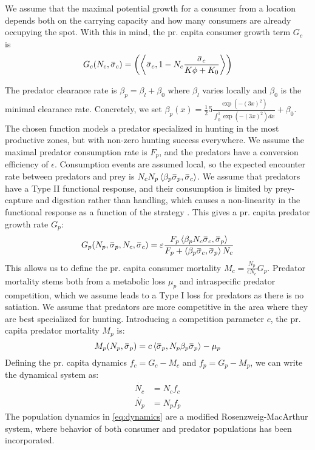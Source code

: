 We assume that the maximal potential growth for a consumer from a location depends both on the carrying capacity and how many consumers are already occupying the spot. With this in mind, the pr. capita consumer growth term $G_c$ is
\begin{equation}
  G_c(N_c, \overbar{\sigma}_c) = \pa{\ip{\overbar{\sigma}_c}{1-N_c \frac{\overbar{\sigma}_c}{K\phi + K_0}}}
\end{equation}

The predator clearance rate is $\beta_p = \beta_{l} + \beta_0$ where $\beta_l$ varies locally and $\beta_0$ is the minimal clearance rate. Concretely, we set $\beta_p(x) = \frac{1}{2}5 \frac{\exp(-(3 x)^2)}{\int_0^1 \exp(-(3 x)^2) dx} + \beta_0$. The chosen function models a predator specialized in hunting in the most productive zones, but with non-zero hunting success everywhere. We assume the maximal predator consumption rate is $F_p$, and the predators have a conversion efficiency of $\epsilon$. Consumption events are assumed local, so the expected encounter rate between predators and prey is $N_c N_p \ip{\beta_p \overbar{\sigma}_p}{\overbar{\sigma}_c}$. We assume that predators have a Type II functional response, and their consumption is limited by prey-capture and digestion rather than handling, which causes a non-linearity in the functional response as a function of the strategy \citep{Kioerboe2018}. This gives a pr. capita predator growth rate $G_p$:
\begin{equation}
  G_p(N_p, \overbar{\sigma}_p, N_c, \overbar{\sigma}_c )= \epsilon\frac{F_p \ip{\beta_p N_c\overbar{\sigma}_c}{\overbar{\sigma}_p} }{F_p + \ip{\beta_p \overbar{\sigma}_c}{\overbar{\sigma}_p} N_c}
\end{equation}
This allows us to define the pr. capita consumer mortality $M_c = \frac{N_p}{\epsilon N_c}G_p$. Predator mortality stems both from a metabolic loss $\mu_p$ and intraspecific predator competition, which we assume leads to a Type I loss for predators as there is no satiation. We assume that predators are more competitive in the area where they are best specialized for hunting. Introducing a competition parameter $c$, the pr. capita predator mortality $M_p$ is:
\begin{equation}
  M_p(N_p, \overbar{\sigma}_p) =  c \ip{\overbar{\sigma}_p}{N_p\beta_p \overbar{\sigma}_p}  - \mu_p
\end{equation}
Defining the pr. capita dynamics $f_c = G_c - M_c$ and $f_p = G_p - M_p$, we can write the dynamical system as:
\begin{equation}
  \label{eq:dynamics}
  \begin{split}
    \dot{N_c} &= N_c f_c \\
    \dot{N_p} &= N_p f_p
  \end{split}
\end{equation}
The population dynamics in \cref{eq:dynamics} are a modified Rosenzweig-MacArthur system, where behavior of both consumer and predator populations has been incorporated.
